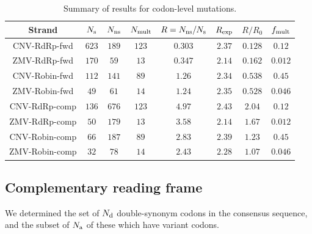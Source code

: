 \documentclass[unnumsec,webpdf,contemporary,large,namedate]{oup-authoring-template}%
\theoremstyle{thmstyleone}%
\theoremstyle{thmstyletwo}%
\theoremstyle{thmstylethree}%
\begin{document}
\begin{table}
\centering
\begin{tabular}{|c|c|c|c|c|c|c|c|}
\hline
Strand&$N_{\rm s}$&$N_{\rm ns}$&$N_{\rm mult}$&$R=N_{\rm ns}/N_{\rm s}$&$R_{\rm exp}$
&$R/R_0$&$f_{\rm mult}$\\ 
\hline
CNV-RdRp-fwd   &$623$ &$189$ & $123$ &$0.303$ &$2.37$&$0.128$&$0.12$\\
ZMV-RdRp-fwd   &$170$ &$59$ & $13$ &$0.347$ &$2.14$&$0.162$&$0.012$\\  
CNV-Robin-fwd   &$112$&$141$& $89$   &$1.26$ & $2.34$&$0.538$&$0.45$\\ 
ZMV-Robin-fwd   &$49$&$61$& $14$   &$1.24$ & $2.35$&$0.528$&$0.046$\\ 
CNV-RdRp-comp &$136$&$676$& $123$ &$4.97$ &$2.43$&$2.04$&$0.12$\\ 
ZMV-RdRp-comp &$50$&$179$& $13$ &$3.58$ &$2.14$&$1.67$&$0.012$\\ 
CNV-Robin-comp &$66$&$187$&$89$&$2.83$&$2.39$&$1.23$&$0.45$\\ 
ZMV-Robin-comp &$32$&$78$&$14$&$2.43$&$2.28$&$1.07$&$0.046$\\ 
\hline
\end{tabular}
\caption{
\centering
Summary of results for codon-level mutations.
\label{tab: 5.2}}
\end{table}

\subsection{Complementary reading frame}
\label{sec: 5.2}

We determined the set of $N_{\rm d}$ double-synonym codons in the consensus sequence, and 
the subset of $N_{\rm a}$ of these which have variant codons. 
\end{document}
